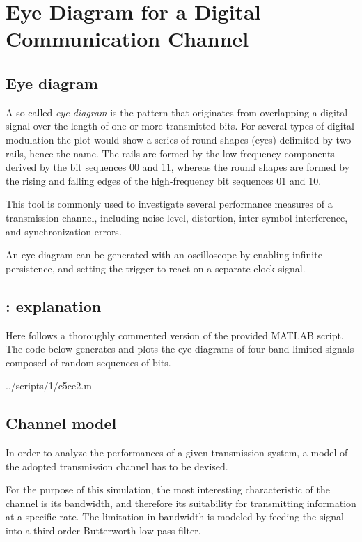 \section{Eye Diagram for a Digital Communication Channel}

\subsection{Eye diagram}
A so-called \emph{eye diagram} is the pattern that originates from overlapping a digital signal over the length of one or more transmitted bits.
For several types of digital modulation the plot would show a series of round shapes (eyes) delimited by two rails, hence the name.
The rails are formed by the low-frequency components derived by the bit sequences 00 and 11, whereas the round shapes are formed by the rising and falling edges of the high-frequency bit sequences 01 and 10.

This tool is commonly used to investigate several performance measures of a transmission channel, including noise level, distortion, inter-symbol interference, and synchronization errors.

An eye diagram can be generated with an oscilloscope by enabling infinite persistence, and setting the trigger to react on a separate clock signal.


\subsection{: explanation}
Here follows a thoroughly commented version of the provided  MATLAB script.
The code below generates and plots the eye diagrams of four band-limited signals composed of random sequences of bits.

\begin{lstinputlisting}[language=Octave]{../scripts/1/c5ce2.m}
\end{lstinputlisting}


\subsection{Channel model}
In order to analyze the performances of a given transmission system, a model of the adopted transmission channel has to be devised.

For the purpose of this simulation, the most interesting characteristic of the channel is its bandwidth, and therefore its suitability for transmitting information at a specific rate.
The limitation in bandwidth is modeled by feeding the signal into a third-order Butterworth low-pass filter.

